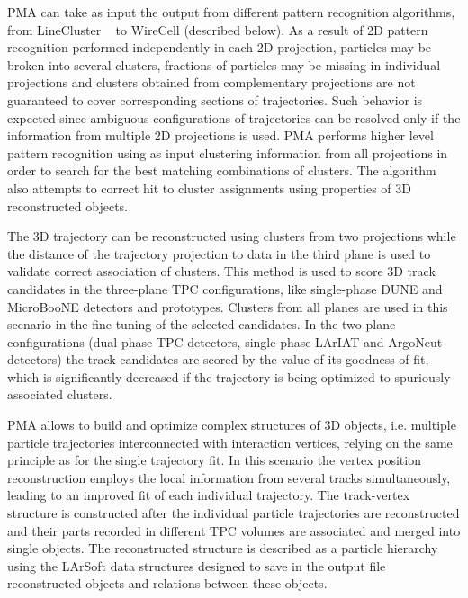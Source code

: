 PMA can take as input the output from different pattern recognition algorithms, from
LineCluster ~\cite{linecluster} to WireCell (described below). As a result of 2D pattern
recognition performed independently in each 2D projection, particles may be broken
into several clusters, fractions of particles may be missing in individual projections
and clusters obtained from complementary projections are not guaranteed to cover corresponding
sections of trajectories. Such behavior is expected since ambiguous configurations of
trajectories can be resolved only if the information from multiple 2D projections is used.
PMA performs higher level pattern recognition using as input clustering information from all
projections in order to search for the best matching combinations of clusters. The algorithm
also attempts to correct hit to cluster assignments using properties of 3D reconstructed objects.

The 3D trajectory can be reconstructed using clusters from two projections while the distance of
the trajectory projection to data in the third plane is used to validate correct association of clusters.
This method is used to score 3D track candidates in the three-plane TPC configurations, like single-phase
DUNE and MicroBooNE detectors and prototypes. Clusters from all planes are used in this scenario in the
fine tuning of the selected candidates. In the two-plane configurations (dual-phase TPC detectors, single-phase
LArIAT and ArgoNeut detectors) the track candidates are scored by the value of its goodness of fit, which is
significantly decreased if the trajectory is being optimized to spuriously associated clusters.

PMA allows to build and optimize complex structures of 3D objects, i.e. multiple particle trajectories
interconnected with interaction vertices, relying on the same principle as for the single trajectory fit.
In this scenario the vertex position reconstruction employs the local information from several tracks
simultaneously, leading to an improved fit of each individual trajectory. The track-vertex structure
is constructed after the individual particle trajectories are reconstructed and their parts recorded
in different TPC volumes are associated and merged into single objects.
The reconstructed structure is described as a particle hierarchy using the LArSoft data structures
designed to save in the output file reconstructed objects and relations between these objects.

